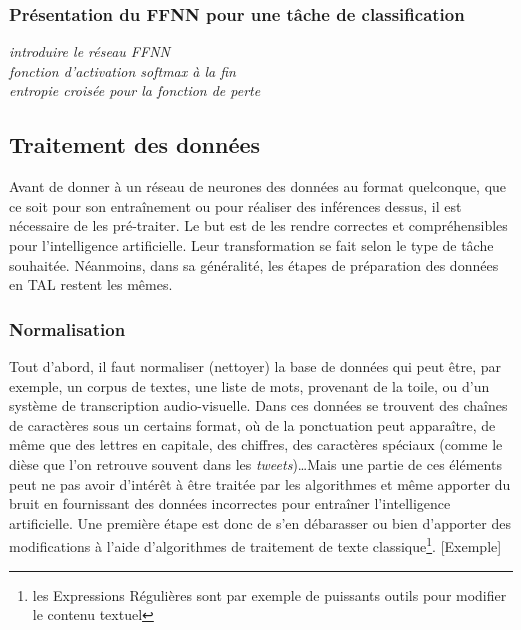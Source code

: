 \documentclass[12pt, french, twoside]{report}
\begin{document}
\subsubsection{Présentation du FFNN pour une tâche de classification}
\textit{introduire le réseau FFNN\\
    fonction d'activation softmax à la fin\\
    entropie croisée pour la fonction de perte\\
    }
\subsection{Traitement des données}

Avant de donner à un réseau de neurones des données au format quelconque, que ce soit pour son entraînement ou pour réaliser des inférences dessus, il est nécessaire de les pré-traiter. Le but est de les rendre correctes et compréhensibles pour l'intelligence artificielle. Leur transformation se fait selon le type de tâche souhaitée. Néanmoins, dans sa généralité, les étapes de préparation des données en TAL restent les mêmes.\\

\subsubsection{Normalisation}
Tout d'abord, il faut normaliser (nettoyer) la base de données qui peut être, par exemple, un corpus de textes, une liste de mots, provenant de la toile, ou d'un système de transcription audio-visuelle. Dans ces données se trouvent des chaînes de caractères sous un certains format, où de la ponctuation peut apparaître, de même que des lettres en capitale, des chiffres, des caractères spéciaux (comme le dièse que l'on retrouve souvent dans les \textit{tweets})\dots Mais une partie de ces éléments peut ne pas avoir d'intérêt à être traitée par les algorithmes et même apporter du bruit en fournissant des données incorrectes pour entraîner l'intelligence artificielle. Une première étape est donc de s'en débarasser ou bien d'apporter des modifications à l'aide d'algorithmes de traitement de texte classique\footnote{les Expressions Régulières sont par exemple de puissants outils pour modifier le contenu textuel}.\cite{jurafsky_regular} [Exemple]\\
\end{document}
